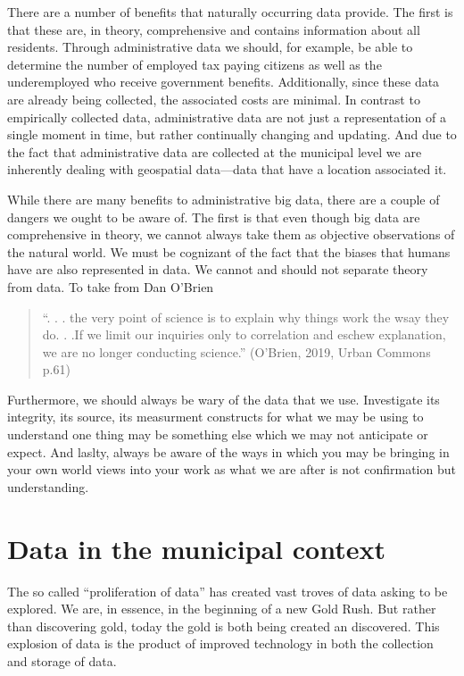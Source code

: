 \documentclass[
]{book}
\begin{document}
There are a number of benefits that naturally occurring data provide. The first is that these are, in theory, comprehensive and contains information about all residents. Through administrative data we should, for example, be able to determine the number of employed tax paying citizens as well as the underemployed who receive government benefits. Additionally, since these data are already being collected, the associated costs are minimal. In contrast to empirically collected data, administrative data are not just a representation of a single moment in time, but rather continually changing and updating. And due to the fact that administrative data are collected at the municipal level we are inherently dealing with geospatial data---data that have a location associated it.

While there are many benefits to administrative big data, there are a couple of dangers we ought to be aware of. The first is that even though big data are comprehensive in theory, we cannot always take them as objective observations of the natural world. We must be cognizant of the fact that the biases that humans have are also represented in data. We cannot and should not separate theory from data. To take from Dan O'Brien

\begin{quote}
``. . . the very point of science is to explain why things work the wsay they do. . .If we limit our inquiries only to correlation and eschew explanation, we are no longer conducting science.'' (O'Brien, 2019, Urban Commons p.61)
\end{quote}

Furthermore, we should always be wary of the data that we use. Investigate its integrity, its source, its measurment constructs for what we may be using to understand one thing may be something else which we may not anticipate or expect. And laslty, always be aware of the ways in which you may be bringing in your own world views into your work as what we are after is not confirmation but understanding.

\hypertarget{data-in-the-municipal-context}{%
\chapter{Data in the municipal context}\label{data-in-the-municipal-context}}

The so called ``proliferation of data'' has created vast troves of data asking to be explored. We are, in essence, in the beginning of a new Gold Rush. But rather than discovering gold, today the gold is both being created an discovered. This explosion of data is the product of improved technology in both the collection and storage of data.
\end{document}

